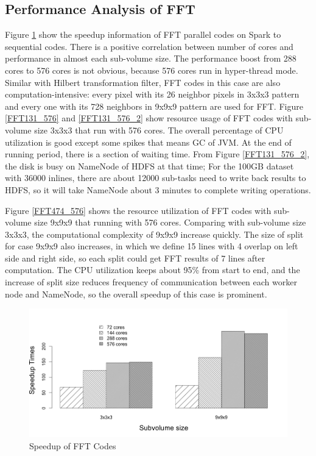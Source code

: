 \subsection{Performance Analysis of FFT}
Figure \ref{FFTSpeedup} show the speedup information of FFT parallel codes on Spark to sequential codes. There is a positive correlation between number of cores and performance in almost each sub-volume size. The performance boost from 288 cores to 576 cores is not obvious, because 576 cores run in hyper-thread mode. Similar with Hilbert transformation filter, FFT codes in this case are also computation-intensive: every pixel with its 26 neighbor pixels in 3x3x3 pattern and every one with its 728 neighbors in 9x9x9 pattern are used for FFT. Figure \ref{FFT131_576} and \ref{FFT131_576_2} show resource usage of FFT codes with sub-volume size 3x3x3 that run with 576 cores. The overall percentage of CPU utilization is good except some spikes that means GC of JVM. At the end of running period, there is a section of waiting time. From Figure \ref{FFT131_576_2}, the disk is busy on NameNode of HDFS at that time; For the 100GB dataset with 36000 inlines, there are about 12000 sub-tasks need to write back results to HDFS, so it will take NameNode about 3 minutes to complete writing operations.

Figure \ref{FFT474_576} shows the resource utilization of FFT codes with sub-volume size 9x9x9 that running with 576 cores. Comparing with sub-volume size 3x3x3, the computational complexity of 9x9x9 increase quickly. The size of split for case 9x9x9 also increases, in which we define 15 lines with 4 overlap on left side and right side, so each split could get FFT results of 7 lines after computation. The CPU utilization keeps about 95\% from start to end, and the increase of split size reduces frequency of communication between each worker node and NameNode, so the overall speedup of this case is prominent. 

\begin{figure}[!ht]
\centering
\includegraphics[scale=.50]{figures/FFTSpeedup.png}
\caption{Speedup of FFT Codes}
\label{FFTSpeedup}
\end{figure}
 

